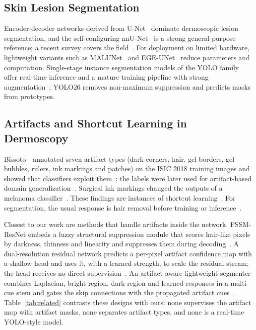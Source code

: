 \subsection{Skin Lesion Segmentation}
Encoder-decoder networks derived from U-Net~\cite{ronneberger2015unet} dominate dermoscopic lesion segmentation, and the self-configuring nnU-Net~\cite{isensee2021nnunet} is a strong general-purpose reference; a recent survey covers the field~\cite{mirikharaji2023survey}. For deployment on limited hardware, lightweight variants such as MALUNet~\cite{ruan2022malunet} and EGE-UNet~\cite{ruan2023egeunet} reduce parameters and computation. Single-stage instance segmentation models of the YOLO family offer real-time inference and a mature training pipeline with strong augmentation~\cite{bochkovskiy2020yolov4,jocher2026yolo26}; YOLO26 removes non-maximum suppression and predicts masks from prototypes. 

\subsection{Artifacts and Shortcut Learning in Dermoscopy}
Bissoto~\etal\ annotated seven artifact types (dark corners, hair, gel borders, gel bubbles, rulers, ink markings and patches) on the ISIC 2018 training images and showed that classifiers exploit them~\cite{bissoto2020debiasing,bissoto2022artifact}; the labels were later used for artifact-based domain generalization~\cite{bissoto2022artifact}. Surgical ink markings changed the outputs of a melanoma classifier~\cite{winkler2019markings}. These findings are instances of shortcut learning~\cite{geirhos2020shortcut}. For segmentation, the usual response is hair removal before training or inference~\cite{lee1997dullrazor,rana2025explainable}.

Closest to our work are methods that handle artifacts inside the network. FSSM-ResNet embeds a fuzzy structural suppression module that scores hair-like pixels by darkness, thinness and linearity and suppresses them during decoding~\cite{raikhankyzy2026fssm}. A dual-resolution residual network predicts a per-pixel artifact confidence map with a shallow head and uses it, with a learned strength, to scale the residual stream; the head receives no direct supervision~\cite{singh2025dualresolution}. An artifact-aware lightweight segmenter combines Laplacian, bright-region, dark-region and learned responses in a multi-cue stem and gates the skip connections with the propagated artifact cues~\cite{gong2026artifactaware}. Table~\ref{tab:related} contrasts these designs with ours: none supervises the artifact map with artifact masks, none separates artifact types, and none is a real-time YOLO-style model.

